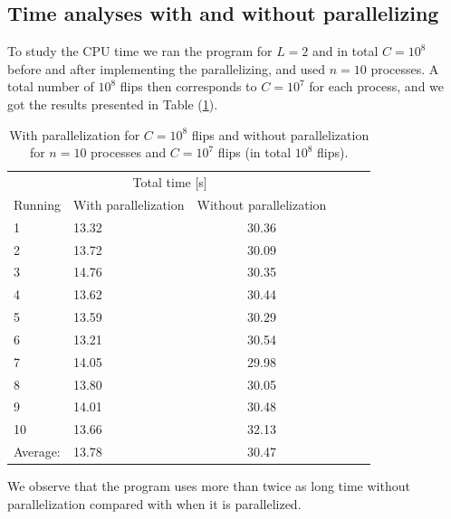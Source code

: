 \documentclass[norsk,a4paper,12pt]{article}
\begin{document}
\subsection{Time analyses with and without parallelizing}
To study the CPU time we ran the program for $L=2$ and in total $C=10^8$ before and after implementing the parallelizing, and used $n=10$ processes. A total number of $10^8$ flips then corresponds to $C=10^7$ for each process, and we got the results presented in Table (\ref{tab:timeParallelize}). 
\begin{table}[H]
\centering
\caption{With parallelization for $C=10^8$ flips and without parallelization for $n=10$ processes and $C=10^7$ flips (in total $10^8$ flips).}
\label{tab:timeParallelize} 
\begin{tabularx}{\textwidth}{XlcXrX}
&&\\
\toprule
\multicolumn{3}{c}{Total time [s]}\\
\cline{2-3}
Running  & With parallelization  & Without parallelization \\
\midrule
1	& 13.32  & 30.36    \\
2   & 13.72  & 30.09    \\
3   & 14.76  & 30.35    \\
4   & 13.62  & 30.44    \\
5   & 13.59  & 30.29    \\
6 	& 13.21  & 30.54    \\
7 	& 14.05  & 29.98    \\
8   & 13.80  & 30.05    \\
9   & 14.01  & 30.48    \\
10  & 13.66  & 32.13    \\
\midrule
Average: & 13.78 & 30.47 \\
\bottomrule
\end{tabularx}
\end{table}
We observe that the program uses more than twice as long time without parallelization compared with when it is parallelized. 
\end{document}

